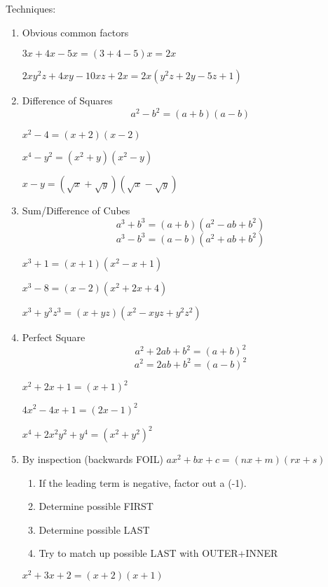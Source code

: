 \documentclass[letterpaper,12pt,fleqn]{article}
\begin{document}
Techniques:
\begin{enumerate}
\item Obvious common factors
  \begin{example}
    $3x+4x-5x=(3+4-5)x=2x$

    $2xy^2z+4xy-10xz+2x=2x(y^2z+2y-5z+1)$
  \end{example}

\item Difference of Squares
  \[a^2-b^2=(a+b)(a-b)\]

  \begin{example}
    $x^2-4=(x+2)(x-2)$

    $x^4-y^2=(x^2+y)(x^2-y)$

    $x-y=(\sqrt{x}+\sqrt{y})(\sqrt{x}-\sqrt{y})$
  \end{example}

\item Sum/Difference of Cubes
  \[a^3+b^3=(a+b)(a^2-ab+b^2)\]
  \[a^3-b^3=(a-b)(a^2+ab+b^2)\]

  \begin{example}
    $x^3+1=(x+1)(x^2-x+1)$

    $x^3-8=(x-2)(x^2+2x+4)$

    $x^3+y^3z^3=(x+yz)(x^2-xyz+y^2z^2)$
  \end{example}

\item Perfect Square
  \[a^2+2ab+b^2=(a+b)^2\]
  \[a^2=2ab+b^2=(a-b)^2\]

  \begin{example}
    $x^2+2x+1=(x+1)^2$

    $4x^2-4x+1=(2x-1)^2$

    $x^4+2x^2y^2+y^4=(x^2+y^2)^2$
  \end{example}

\item By inspection (backwards FOIL)
  $ax^2+bx+c=(nx+m)(rx+s)$

  \begin{enumerate}
  \item If the leading term is negative, factor out a (-1).
  \item Determine possible FIRST
  \item Determine possible LAST
  \item Try to match up possible LAST with OUTER+INNER
  \end{enumerate}

  \begin{example}
    $x^2+3x+2=(x+2)(x+1)$


\end{example}
\end{enumerate}
\end{document}

